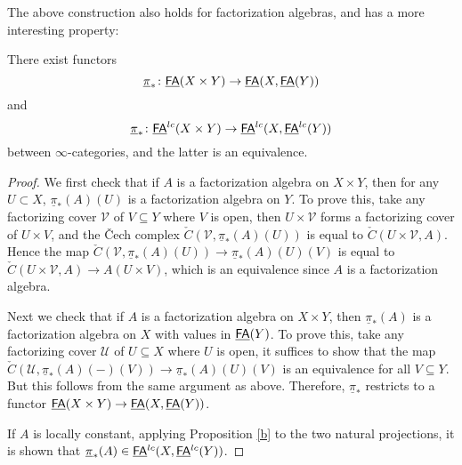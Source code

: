 \documentclass[twoside]{article}
\begin{document}
The above construction also holds for factorization algebras, and has a
more interesting property:

\begin{proposition}\label{j}
    There exist functors \[\underline\pi_*\colon\underline{\smash{\mathsf{FA}}}(X\times Y)\to\underline{\smash{\mathsf{FA}}}(X,\underline{\smash{\mathsf{FA}}}(Y))\]
    and \[\underline\pi_*\colon\underline{\smash{\mathsf{FA}}}^{lc}(X\times Y)\to\underline{\smash{\mathsf{FA}}}^{lc}(X,\underline{\smash{\mathsf{FA}}}^{lc}(Y))\] between
    $\infty$-categories, and the latter is an equivalence.
\end{proposition}

\begin{proof}
    We first check that if $A$ is a factorization algebra on $X\times Y$, then for
    any $U\subset X$, $\underline\pi_*(A)(U)$ is a factorization algebra on $Y$.
    To prove this, take any factorizing cover $\mathscr V$ of $V\subseteq Y$ where
    $V$ is open, then $U\times\mathscr V$ forms a factorizing cover of $U\times V$,
    and the \v{C}ech complex $\check{C}(\mathscr V,\underline\pi_*(A)(U))$
    is equal to $\check{C}(U\times\mathscr V,A)$. Hence the map 
    $\check{C}(\mathscr V,\underline\pi_*(A)(U))\to\underline\pi_*(A)(U)(V)$
    is equal to $\check{C}(U\times\mathscr V,A)\to A(U\times V)$, which is
    an equivalence since $A$ is a factorization algebra. 

    Next we check that if $A$ is a factorization algebra on $X\times Y$,
    then $\underline\pi_*(A)$ is a factorization algebra on $X$ with values in
    $\underline{\smash{\mathsf{FA}}}(Y)$. To prove this, take any factorizing cover $\mathscr U$ 
    of $U\subseteq X$ where $U$ is open, it suffices to show that the map
    $\check{C}(\mathscr U,\underline\pi_*(A)(-)(V))\to\underline\pi_*(A)(U)(V)$
    is an equivalence for all $V\subseteq Y$. But this follows from the same argument
    as above. Therefore, $\underline\pi_*$ restricts to a functor 
    $\underline{\smash{\mathsf{FA}}}(X\times Y)\to\underline{\smash{\mathsf{FA}}}(X,\underline{\smash{\mathsf{FA}}}(Y))$.

    If $A$ is locally constant, applying Proposition \ref{b} to the two natural
    projections, it is shown that $\underline\pi_*(A)\in\underline{\smash{\mathsf{FA}}}^{lc}
    (X,\underline{\smash{\mathsf{FA}}}^{lc}(Y))$.


\end{proof}
\end{document}
